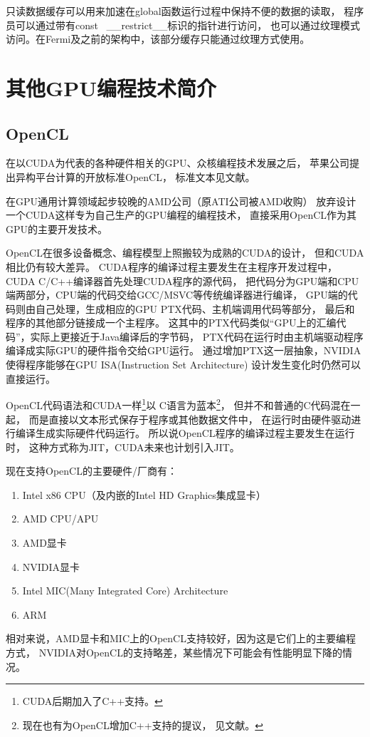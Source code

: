 只读数据缓存可以用来加速在global函数运行过程中保持不便的数据的读取，
程序员可以通过带有const  \_\_restrict\_\_标识的指针进行访问，
也可以通过纹理模式访问。在Fermi及之前的架构中，该部分缓存只能通过纹理方式使用。
\cite{cudadoc-KeplerGK110ArchitectureWhitepaper}



\section{其他GPU编程技术简介}

\subsection{OpenCL}

在以CUDA为代表的各种硬件相关的GPU、众核编程技术发展之后，
苹果公司提出异构平台计算的开放标准OpenCL，
标准文本见文献。

在GPU通用计算领域起步较晚的AMD公司（原ATI公司被AMD收购）
放弃设计一个CUDA这样专为自己生产的GPU编程的编程技术，
直接采用OpenCL作为其GPU的主要开发技术。

OpenCL在很多设备概念、编程模型上照搬较为成熟的CUDA的设计，
但和CUDA相比仍有较大差异。
CUDA程序的编译过程主要发生在主程序开发过程中，CUDA C/C++编译器首先处理CUDA程序的源代码，
把代码分为GPU端和CPU端两部分，CPU端的代码交给GCC/MSVC等传统编译器进行编译，
GPU端的代码则由自己处理，生成相应的GPU PTX代码、主机端调用代码等部分，
最后和程序的其他部分链接成一个主程序。
这其中的PTX代码类似“GPU上的汇编代码”，实际上更接近于Java编译后的字节码，
PTX代码在运行时由主机端驱动程序编译成实际GPU的硬件指令交给GPU运行。
通过增加PTX这一层抽象，NVIDIA使得程序能够在GPU ISA(Instruction Set Architecture)
设计发生变化时仍然可以直接运行。

OpenCL代码语法和CUDA一样\footnote{CUDA后期加入了C++支持。}以
C语言为蓝本\footnote{现在也有为OpenCL增加C++支持的提议，%
见文献。}，
但并不和普通的C代码混在一起，
而是直接以文本形式保存于程序或其他数据文件中，
在运行时由硬件驱动进行编译生成实际硬件代码运行。
所以说OpenCL程序的编译过程主要发生在运行时，
这种方式称为JIT，CUDA未来也计划引入JIT\cite{MarkGTC2013}。


现在支持OpenCL的主要硬件/厂商有：\cite{opencl-conformant-products}
\begin{enumerate}[1)]
\item Intel x86 CPU（及内嵌的Intel HD Graphics集成显卡）
\item AMD CPU/APU
\item AMD显卡
\item NVIDIA显卡
\item Intel MIC(Many Integrated Core) Architecture
\item ARM
\end{enumerate}
相对来说，AMD显卡和MIC上的OpenCL支持较好，因为这是它们上的主要编程方式，
NVIDIA对OpenCL的支持略差，某些情况下可能会有性能明显下降的情况。


